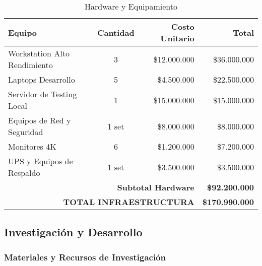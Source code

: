 \begin{table}[H]
    \centering
    \caption{Hardware y Equipamiento}
    \label{tab:hardware}
    \small
    \begin{tabular}{|l|c|r|r|}
        \hline
        \textbf{Equipo} & \textbf{Cantidad} & \textbf{Costo Unitario} & \textbf{Total} \\
        \hline
        Workstation Alto Rendimiento & 3 & \$12.000.000 & \$36.000.000 \\
        \hline
        Laptops Desarrollo & 5 & \$4.500.000 & \$22.500.000 \\
        \hline
        Servidor de Testing Local & 1 & \$15.000.000 & \$15.000.000 \\
        \hline
        Equipos de Red y Seguridad & 1 set & \$8.000.000 & \$8.000.000 \\
        \hline
        Monitores 4K & 6 & \$1.200.000 & \$7.200.000 \\
        \hline
        UPS y Equipos de Respaldo & 1 set & \$3.500.000 & \$3.500.000 \\
        \hline
        \multicolumn{3}{|r|}{\textbf{Subtotal Hardware}} & \textbf{\$92.200.000} \\
        \hline
        \multicolumn{3}{|r|}{\textbf{TOTAL INFRAESTRUCTURA}} & \textbf{\$170.990.000} \\
        \hline
    \end{tabular}
\end{table}

\subsection{Investigación y Desarrollo}

\subsubsection{Materiales y Recursos de Investigación}

